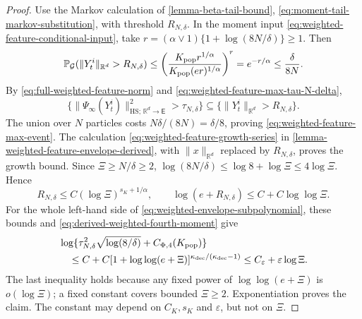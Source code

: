 \begin{proof}
Use the Markov calculation of \cref{lemma-beta-tail-bound},
\eqref{eq:moment-tail-markov-substitution}, with threshold $R_{N,\delta}$.
In the moment input \eqref{eq:weighted-feature-conditional-input}, take
$r=(\alpha\vee1)\{1+\log(8N/\delta)\}\ge1$. Then
\[
 \mathbb P_{\mathcal G}(\|Y_t^i\|_{\mathbb R^d}>R_{N,\delta})
 \le\left(\frac{K_{\rm pop}r^{1/\alpha}}
                   {K_{\rm pop}(er)^{1/\alpha}}\right)^r
 =e^{-r/\alpha}\le\frac{\delta}{8N}.
\]
By \eqref{eq:full-weighted-feature-norm} and
\eqref{eq:weighted-feature-max-tau-N-delta},
\[
 \{\|\Psi_\infty(Y_t^i)\|_{\mathrm{HS};\,\mathbb R^d\to\mathsf E}^2>\tau_{N,\delta}\}
 \subseteq\{\|Y_t^i\|_{\mathbb R^d}>R_{N,\delta}\}.
\]
The union over $N$ particles costs $N\delta/(8N)=\delta/8$, proving
\eqref{eq:weighted-feature-max-event}.
The calculation \eqref{eq:weighted-feature-growth-series} in
\cref{lemma-weighted-feature-envelope-derived}, with $\|x\|_{\mathbb R^d}$ replaced by
$R_{N,\delta}$, proves the growth bound.
Since $\Xi\ge N/\delta\ge2$,
$\log(8N/\delta)\le\log8+\log\Xi\le4\log\Xi$. Hence
\[
 R_{N,\delta}\le C(\log\Xi)^{s_K+1/\alpha},\qquad
 \log(e+R_{N,\delta})\le C+C\log\log\Xi.
\]
For the whole left-hand side of \eqref{eq:weighted-envelope-subpolynomial},
these bounds and \eqref{eq:derived-weighted-fourth-moment} give
\[
\begin{aligned}
 &\log\{\tau_{N,\delta}^2\sqrt{\log(8/\delta)}
                      +C_{\Phi,4}(K_{\rm pop})\}\\
 &\quad\le C+C[1+\log\log(e+\Xi)]^{\kappa_{\rm dec}/(\kappa_{\rm dec}-1)}
 \le C_\varepsilon+\varepsilon\log\Xi.
\end{aligned}
\]
The last inequality holds because any fixed power of $\log\log(e+\Xi)$
is $o(\log\Xi)$; a fixed constant covers bounded $\Xi\ge2$.
Exponentiation proves the claim. The constant may depend on $C_K,s_K$
and $\varepsilon$, but not on $\Xi$.
\end{proof}

